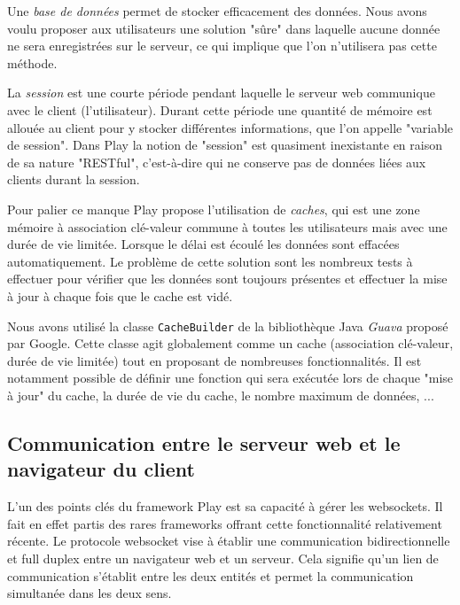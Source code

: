 Une \textit{base de données} permet de stocker efficacement des données.
Nous avons voulu proposer aux utilisateurs une solution "sûre" dans laquelle aucune donnée ne sera enregistrées sur le serveur, ce qui implique que l'on n'utilisera pas cette méthode.

La \textit{session} est une courte période pendant laquelle le serveur web communique avec le client (l'utilisateur).
Durant cette période une quantité de mémoire est allouée au client pour y stocker différentes informations, que l'on appelle "variable de session".
Dans Play la notion de "session" est quasiment inexistante en raison de sa nature "RESTful", c'est-à-dire qui ne conserve pas de données liées aux clients durant la session.

Pour palier ce manque Play propose l'utilisation de \textit{caches}, qui est une zone mémoire à association clé-valeur commune à toutes les utilisateurs mais avec une durée de vie limitée.
Lorsque le délai est écoulé les données sont effacées automatiquement.
Le problème de cette solution sont les nombreux tests à effectuer pour vérifier que les données sont toujours présentes et effectuer la mise à jour à chaque fois que le cache est vidé.

Nous avons utilisé la classe \lstinline{CacheBuilder} de la bibliothèque Java \textit{Guava} proposé par Google.
Cette classe agit globalement comme un cache (association clé-valeur, durée de vie limitée) tout en proposant de nombreuses fonctionnalités.
Il est notamment possible de définir une fonction qui sera exécutée lors de chaque "mise à jour" du cache, la durée de vie du cache, le nombre maximum de données, ...



\subsection{Communication entre le serveur web et le navigateur du client}

L'un des points clés du framework Play est sa capacité à gérer les websockets. Il fait en effet partis des rares
frameworks offrant cette fonctionnalité relativement récente. Le protocole websocket vise à établir 
une communication bidirectionnelle et full duplex entre un navigateur web et un serveur. Cela signifie
qu'un lien de communication s'établit entre les deux entités et permet la communication simultanée
dans les deux sens. 

